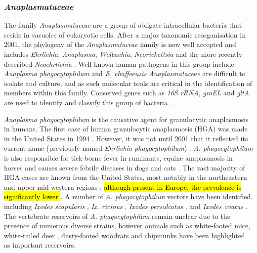 \documentclass[a4paper, nobind]{templates/ociamthesis}
\begin{document}
\hypertarget{anaplasmataceae}{%
\subsubsection{\texorpdfstring{\emph{Anaplasmataceae}}{Anaplasmataceae}}\label{anaplasmataceae}}

The family \emph{Anaplasmataceae} are a group of obligate intracellular bacteria that reside in vacuoles of eukaryotic cells.
After a major taxonomic reorganisation in 2001, the phylogeny of the \emph{Anaplasmataceae} family is now well accepted and includes \emph{Ehrlichia}, \emph{Anaplasma}, \emph{Wolbachia}, \emph{Neorickettsia} and the more recently described \emph{Neoehrlichia} \autocite{rarGeneticDiversityAnaplasma2021}.
Well known human pathogens in this group include \emph{Anaplasma phagocytophilum} and \emph{E, chaffeensis}
\emph{Anaplasmataceae} are difficult to isolate and culture, and as such molecular tools are critical in the identification of members within this family.
Conserved genes such as \emph{16S rRNA}, \emph{groEL} and \emph{gltA} are used to identify and classify this group of bacteria \autocite{kawaharaUltrastructurePhylogeneticAnalysis2004}.

\emph{Anaplasma phagocytophilum} is the causative agent for granulocytic anaplasmosis in humans. The first case of human granulocytic anaplasmosis (HGA) was made in the United States in 1994 \autocite{chenIdentificationGranulocytotropicEhrlichia1994}.
However, it was not until 2001 that it reflected its current name (previously named \emph{Ehrlichia phagocytophilum}) \autocite{dumlerReorganizationGeneraFamilies2001}.
\emph{A. phagocytophilum} is also responsible for tick-borne fever in ruminants, equine anaplasmosis in horses and causes severe febrile diseases in dogs and cats \autocite{rarAnaplasmaEhrlichiaCandidatus2011}.
The vast majority of HGA cases are known from the United States, most notably in the northeastern and upper mid-western regions \autocite{mmwrFinal2009Reports2010}; \hl{although present in Europe, the prevalence is significantly lower \autocite{bakkenHumanGranulocyticAnaplasmosis2015}}.
A number of \emph{A. phagocytophilum} vectors have been identified, including \emph{Ixodes scapularis} \autocite{telfordPerpetuationAgentHuman1996,hodzicAcquisitionTransmissionAgent1998}, \emph{Ix. ricinus} \autocite{lizPCRDetectionGranulocytic2000}, \emph{Ixodes persulcatus} \autocite{eremeevaPrevalenceBacterialAgents2006}, and \emph{Ixodes ovatus} \autocite{ohashiAnaplasmaPhagocytophilumInfected2005}.
The vertebrate reservoirs of \emph{A. phagocytophilum} remain unclear due to the presence of numerous diverse strains, however animals such as white-footed mice, white-tailed deer \autocite{telfordPerpetuationAgentHuman1996,ravynIsolationEtiologicAgent2001}, dusty-footed woodrats \autocite{nicholsonDuskyFootedWoodRats1999} and chipmunks \autocite{foleyDistinctEcologicallyRelevant2009} have been highlighted as important reservoirs.
\end{document}
